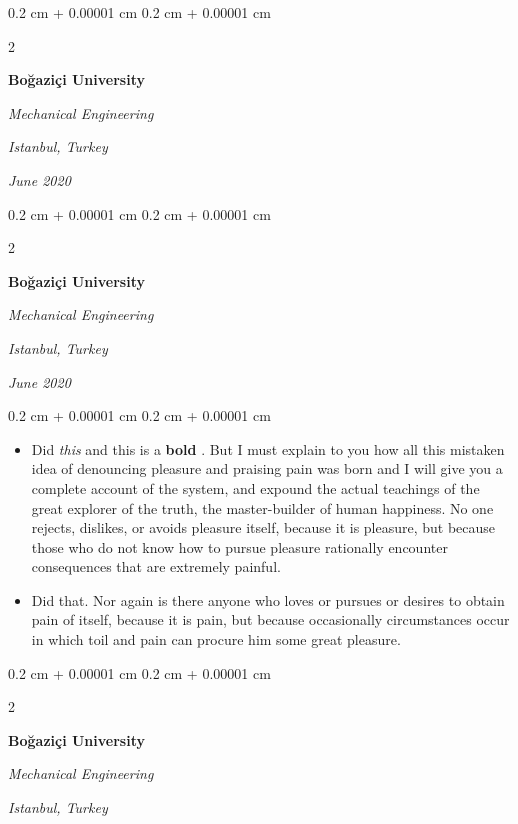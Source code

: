 \documentclass[10pt, letterpaper]{article}
\newenvironment{highlights}{
    \begin{itemize}[
        topsep=0.10 cm,
        parsep=0.10 cm,
        partopsep=0pt,
        itemsep=0pt,
        leftmargin=0.4 cm + 10pt
    ]
}{
    \end{itemize}
} %
\newenvironment{onecolentry}{
    \begin{adjustwidth}{
        0.2 cm + 0.00001 cm
    }{
        0.2 cm + 0.00001 cm
    }
}{
    \end{adjustwidth}
} %
\newenvironment{twocolentry}[2][]{
    \onecolentry
    \def\secondColumn{#2}
    \setcolumnwidth{\fill, 4.5 cm}
    \begin{paracol}{2}
}{
    \switchcolumn \raggedleft \secondColumn
    \end{paracol}
    \endonecolentry
} %
\let\hrefWithoutArrow\href
\renewcommand{\href}[2]{\hrefWithoutArrow{#1}{\ifthenelse{\equal{#2}{}}{ }{#2 }\raisebox{.15ex}{\footnotesize \faExternalLink*}}}
\begin{document}
        \vspace{0.2 cm}

        \begin{twocolentry}{
        \textit{Istanbul, Turkey}    
            
        \textit{June 2020}}
            \textbf{Boğaziçi University}

            \textit{Mechanical Engineering}
        \end{twocolentry}



        \vspace{0.2 cm}

        \begin{twocolentry}{
        \textit{Istanbul, Turkey}    
            
        \textit{June 2020}}
            \textbf{Boğaziçi University}

            \textit{Mechanical Engineering}
        \end{twocolentry}

        \vspace{0.10 cm}
        \begin{onecolentry}
            \begin{highlights}
                \item Did \textit{this} and this is a \textbf{bold} \href{https://example.com}{link}. But I must explain to you how all this mistaken idea of denouncing pleasure and praising pain was born and I will give you a complete account of the system, and expound the actual teachings of the great explorer of the truth, the master-builder of human happiness. No one rejects, dislikes, or avoids pleasure itself, because it is pleasure, but because those who do not know how to pursue pleasure rationally encounter consequences that are extremely painful.
                \item Did that. Nor again is there anyone who loves or pursues or desires to obtain pain of itself, because it is pain, but because occasionally circumstances occur in which toil and pain can procure him some great pleasure.
            \end{highlights}
        \end{onecolentry}


        \vspace{0.2 cm}

        \begin{twocolentry}{
        \textit{Istanbul, Turkey}    
            
        }
            \textbf{Boğaziçi University}

            \textit{Mechanical Engineering}
        \end{twocolentry}
\end{document}
